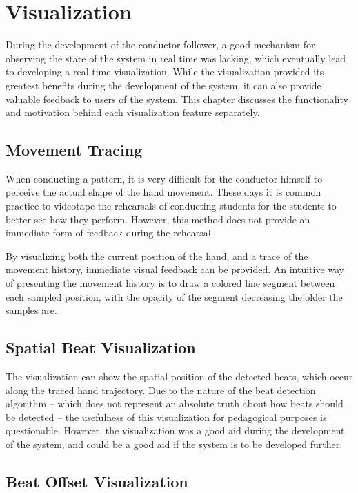 \chapter{Visualization}
\label{chapter:visualization}

During the development of the conductor follower,
a good mechanism for observing the state of the system
in real time was lacking,
which eventually lead to developing a real time visualization.
While the visualization provided its greatest benefits
during the development of the system,
it can also provide valuable feedback to users of the system.
This chapter discusses the functionality
and motivation behind each visualization feature separately.

\section{Movement Tracing}

When conducting a pattern,
it is very difficult for the conductor himself to
perceive the actual shape of the hand movement.
These days it is common practice to 
videotape the rehearsals of conducting students \cite{konttinen2008}
for the students to better see how they perform.
However, this method does not provide an
immediate form of feedback during the rehearsal.

By visualizing both the current position of the hand,
and a trace of the movement history,
immediate visual feedback can be provided.
An intuitive way of presenting the movement history
is to draw a colored line segment between each sampled position,
with the opacity of the segment decreasing the older the samples are.

\section{Spatial Beat Visualization}

The visualization can show the spatial position
of the detected beats,
which occur along the traced hand trajectory.
Due to the nature of the beat detection algorithm --
which does not represent an absolute truth about
how beats should be detected --
the usefulness of this visualization for
pedagogical purposes is questionable.
However, the visualization was a good aid
during the development of the system,
and could be a good aid if the system is to be developed further.

\section{Beat Offset Visualization}

